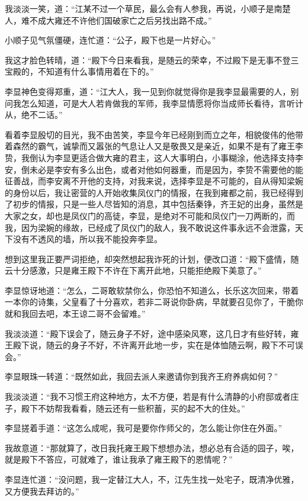 我淡淡一笑，道：“江某不过一个草民，最么会有人参我，再说，小顺子是南楚人，难不成大雍还不许他们国破家亡之后另找出路不成。”

小顺子见气氛僵硬，连忙道：“公子，殿下也是一片好心。”

我这才脸色转晴，道：“殿下今日来看我，是随云的荣幸，不过殿下是无事不登三宝殿的，不知道有什么事情用着在下的。”

李显神色变得郑重，道：“江大人，我一见到你就觉得你是我李显最需要的人，别问我怎么知道，可是大人若肯做我的军师，我李显情愿将你当成师长看待，言听计从，绝不二话。”

看着李显殷切的目光，我不由苦笑，李显今年已经刚到而立之年，相貌俊伟的他带着森然的霸气，诚挚而又嚣张的气息让人又是敬畏又是亲近，如果不是有了雍王李贽，我倒认为李显更适合做大雍的君主，这人大事明白，小事糊涂，他选择支持李安，倒未必是李安有多么出色，或者对他如何器重，而是因为，李贽不需要他的能征善战，而李安离不开他的支持，对我来说，选择李显是不可能的，自从得知梁婉的身份以后，我让密营的人开始收集凤仪门的情报，在我到雍都之前，我已经得到了初步的情报，只是一些人尽皆知的消息，其中包括秦铮，齐王妃的出身，虽然是大家之女，却也是凤仪门的高徒，李显，是绝对不可能和凤仪门一刀两断的，而我，因为梁婉的缘故，已经成了凤仪门的敌人，我不敢说这件事永远不会泄露，天下没有不透风的墙，所以我不能投奔李显。

想到这里我正要严词拒绝，却突然想起我诈死的计划，便改口道：“殿下盛情，随云十分感激，只是雍王殿下不许在下离开此地，只能拒绝殿下美意了。”

李显惊讶地道：“怎么，二哥敢软禁你么，你恐怕不知道么，长乐这次回来，带着一本你的诗集，父皇看了十分喜欢，若非二哥说你卧病，早就要召见你了，干脆你就和我回去吧，本王谅二哥不会留难。”

我淡淡道：“殿下误会了，随云身子不好，途中感染风寒，这几日才有些好转，雍王殿下说，随云的身子不好，不许离开此地一步，实在是体恤随云啊，殿下不可误会。”

李显眼珠一转道：“既然如此，我回去派人来邀请你到我齐王府养病如何？”

我淡淡道：“我不习惯王府这种地方，太不方便，若是有什么清静的小府邸或者庄子，殿下不妨帮我看看，随云还有一些积蓄，买的起不大的住处。”

李显搓着手道：“这怎么成呢，我可是要你作师父的，怎么能让你住在外面。”

我故意道：“那就算了，改日我托雍王殿下想想办法，想必总有合适的园子，唉，就是殿下不答应，可就难了，谁让我承了雍王殿下的恩情呢？”

李显连忙道：“没问题，我一定替江大人，不，江先生找一处宅子，既清净优雅，又方便我去拜访的。”

